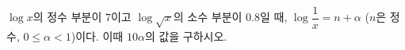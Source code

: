 $\log x$의 정수 부분이 $7$이고 $\log\sqrt{x}$의 소수 부분이 $0.8$일 때, $\log\dfrac{1}{x}=n+\alpha$ ($n$은 정수, $0\le\alpha<1$)이다. 이때 $10\alpha$의 값을 구하시오.
